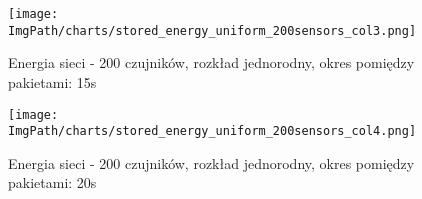 \documentclass[a4paper,12pt,twoside,openany]{report}
\newcommand{\ImgPath}{./img}
\begin{document}
\begin{figure}[H]
	\begin{center}
		\texttt{[image: \\ImgPath/charts/stored\_energy\_uniform\_200sensors\_col3.png]}
	\end{center}
	\caption{Energia sieci - 200 czujników, rozkład jednorodny, okres pomiędzy pakietami: 15s}
\end{figure}

\begin{figure}[H]
	\begin{center}
		\texttt{[image: \\ImgPath/charts/stored\_energy\_uniform\_200sensors\_col4.png]}
	\end{center}
	\caption{Energia sieci - 200 czujników, rozkład jednorodny, okres pomiędzy pakietami: 20s}
\end{figure}
\end{document}
